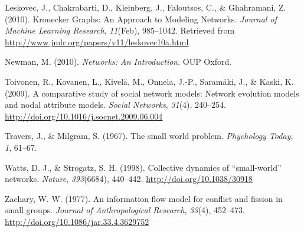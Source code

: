 \documentclass[12pt,twoside]{amherstthesis}
\begin{document}
  \hypertarget{ref-leskovec_kronecker_2010}{}
  Leskovec, J., Chakrabarti, D., Kleinberg, J., Faloutsos, C., \&
  Ghahramani, Z. (2010). Kronecker Graphs: An Approach to Modeling
  Networks. \emph{Journal of Machine Learning Research}, \emph{11}(Feb),
  985--1042. Retrieved from
  \url{http://www.jmlr.org/papers/v11/leskovec10a.html}
  
  \hypertarget{ref-newman_networks:_2010}{}
  Newman, M. (2010). \emph{Networks: An Introduction}. OUP Oxford.
  
  \hypertarget{ref-toivonen_comparative_2009}{}
  Toivonen, R., Kovanen, L., Kivelä, M., Onnela, J.-P., Saramäki, J., \&
  Kaski, K. (2009). A comparative study of social network models: Network
  evolution models and nodal attribute models. \emph{Social Networks},
  \emph{31}(4), 240--254.
  \url{http://doi.org/10.1016/j.socnet.2009.06.004}
  
  \hypertarget{ref-travers1967small}{}
  Travers, J., \& Milgram, S. (1967). The small world problem.
  \emph{Phychology Today}, \emph{1}, 61--67.
  
  \hypertarget{ref-watts_collective_1998}{}
  Watts, D. J., \& Strogatz, S. H. (1998). Collective dynamics of
  ``small-world'' networks. \emph{Nature}, \emph{393}(6684), 440--442.
  \url{http://doi.org/10.1038/30918}
  
  \hypertarget{ref-zachskarateclub}{}
  Zachary, W. W. (1977). An information flow model for conflict and
  fission in small groups. \emph{Journal of Anthropological Research},
  \emph{33}(4), 452--473. \url{http://doi.org/10.1086/jar.33.4.3629752}


\end{document}
